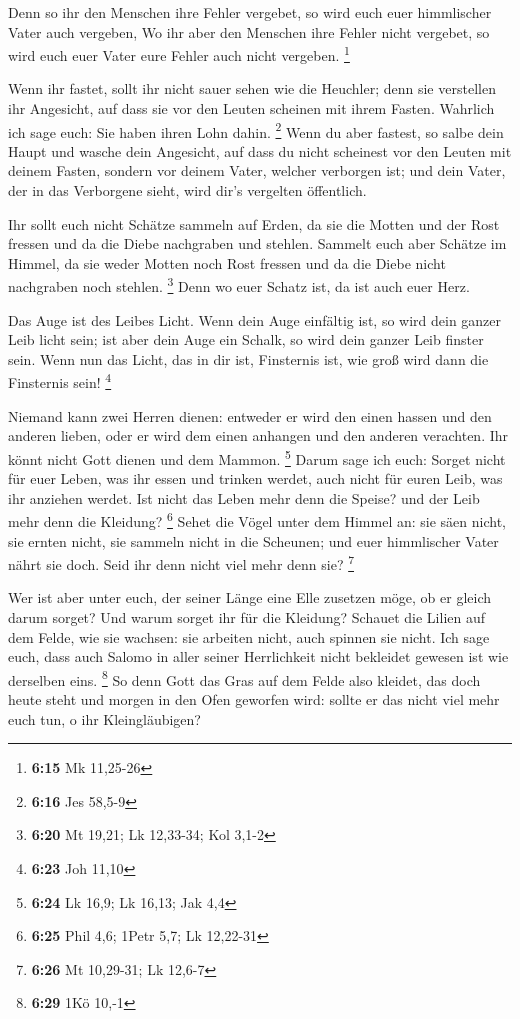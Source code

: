  Denn so ihr den Menschen ihre Fehler vergebet, so wird
euch euer himmlischer Vater auch vergeben,  Wo ihr aber
den Menschen ihre Fehler nicht vergebet, so wird euch euer Vater eure
Fehler auch nicht vergeben. \footnote{\textbf{6:15} Mk 11,25-26}

 Wenn ihr fastet, sollt ihr nicht sauer sehen wie die
Heuchler; denn sie verstellen ihr Angesicht, auf dass sie vor den Leuten
scheinen mit ihrem Fasten. Wahrlich ich sage euch: Sie haben ihren Lohn
dahin. \footnote{\textbf{6:16} Jes 58,5-9}  Wenn du aber
fastest, so salbe dein Haupt und wasche dein Angesicht, 
auf dass du nicht scheinest vor den Leuten mit deinem Fasten, sondern
vor deinem Vater, welcher verborgen ist; und dein Vater, der in das
Verborgene sieht, wird dir's vergelten öffentlich.

 Ihr sollt euch nicht Schätze sammeln auf Erden, da sie
die Motten und der Rost fressen und da die Diebe nachgraben und stehlen.
 Sammelt euch aber Schätze im Himmel, da sie weder Motten
noch Rost fressen und da die Diebe nicht nachgraben noch stehlen.
\footnote{\textbf{6:20} Mt 19,21; Lk 12,33-34; Kol 3,1-2}
 Denn wo euer Schatz ist, da ist auch euer Herz.

 Das Auge ist des Leibes Licht. Wenn dein Auge einfältig
ist, so wird dein ganzer Leib licht sein;  ist aber dein
Auge ein Schalk, so wird dein ganzer Leib finster sein. Wenn nun das
Licht, das in dir ist, Finsternis ist, wie groß wird dann die Finsternis
sein! \footnote{\textbf{6:23} Joh 11,10}

 Niemand kann zwei Herren dienen: entweder er wird den
einen hassen und den anderen lieben, oder er wird dem einen anhangen und
den anderen verachten. Ihr könnt nicht Gott dienen und dem Mammon.
\footnote{\textbf{6:24} Lk 16,9; Lk 16,13; Jak 4,4} 
Darum sage ich euch: Sorget nicht für euer Leben, was ihr essen und
trinken werdet, auch nicht für euren Leib, was ihr anziehen werdet. Ist
nicht das Leben mehr denn die Speise? und der Leib mehr denn die
Kleidung? \footnote{\textbf{6:25} Phil 4,6; 1Petr 5,7; Lk 12,22-31}
 Sehet die Vögel unter dem Himmel an: sie säen nicht, sie
ernten nicht, sie sammeln nicht in die Scheunen; und euer himmlischer
Vater nährt sie doch. Seid ihr denn nicht viel mehr denn sie?
\footnote{\textbf{6:26} Mt 10,29-31; Lk 12,6-7}

 Wer ist aber unter euch, der seiner Länge eine Elle
zusetzen möge, ob er gleich darum sorget?  Und warum
sorget ihr für die Kleidung? Schauet die Lilien auf dem Felde, wie sie
wachsen: sie arbeiten nicht, auch spinnen sie nicht.  Ich
sage euch, dass auch Salomo in aller seiner Herrlichkeit nicht bekleidet
gewesen ist wie derselben eins. \footnote{\textbf{6:29} 1Kö 10,-1}
 So denn Gott das Gras auf dem Felde also kleidet, das
doch heute steht und morgen in den Ofen geworfen wird: sollte er das
nicht viel mehr euch tun, o ihr Kleingläubigen?

